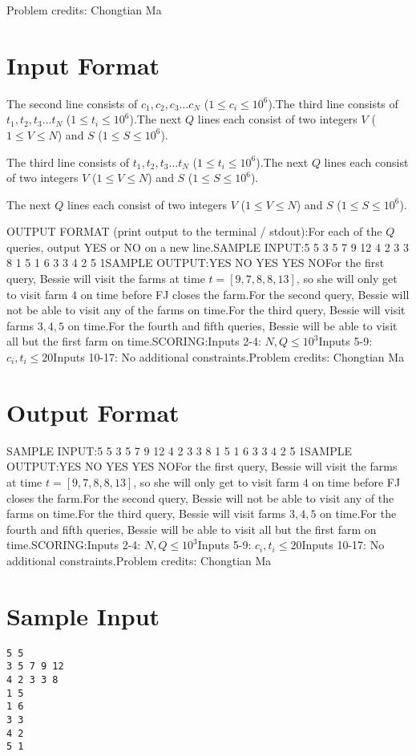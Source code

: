 \documentclass[12pt]{article}
\begin{document}
Problem credits: Chongtian Ma



\section*{Input Format}
The second line consists of $c_1, c_2, c_3 \dots c_N$ ($1 \leq c_i \leq 10^6$).The third line consists of $t_1, t_2, t_3 \dots t_N$ ($1 \leq t_i \leq 10^6$).The next $Q$ lines each consist of two integers $V$ ($1 \leq V \leq N$) and $S$
($1 \leq S \leq 10^6$).

The third line consists of $t_1, t_2, t_3 \dots t_N$ ($1 \leq t_i \leq 10^6$).The next $Q$ lines each consist of two integers $V$ ($1 \leq V \leq N$) and $S$
($1 \leq S \leq 10^6$).

The next $Q$ lines each consist of two integers $V$ ($1 \leq V \leq N$) and $S$
($1 \leq S \leq 10^6$).

OUTPUT FORMAT (print output to the terminal / stdout):For each of the $Q$ queries, output YES or NO on a new line.SAMPLE INPUT:5 5
3 5 7 9 12
4 2 3 3 8
1 5
1 6
3 3
4 2
5 1SAMPLE OUTPUT:YES
NO
YES
YES
NOFor the first query, Bessie will visit the farms at time $t = [9, 7, 8, 8, 13]$,
so she will only get to visit farm $4$ on time before FJ closes the farm.For the second query, Bessie will not be able to visit any of the farms on time.For the third query, Bessie will visit farms $3, 4, 5$ on time.For the fourth and fifth queries, Bessie will be able to visit all but the first
farm on time.SCORING:Inputs 2-4: $N,Q\le 10^3$Inputs 5-9: $c_i, t_i \le 20$Inputs 10-17: No additional constraints.Problem credits: Chongtian Ma

\section*{Output Format}
SAMPLE INPUT:5 5
3 5 7 9 12
4 2 3 3 8
1 5
1 6
3 3
4 2
5 1SAMPLE OUTPUT:YES
NO
YES
YES
NOFor the first query, Bessie will visit the farms at time $t = [9, 7, 8, 8, 13]$,
so she will only get to visit farm $4$ on time before FJ closes the farm.For the second query, Bessie will not be able to visit any of the farms on time.For the third query, Bessie will visit farms $3, 4, 5$ on time.For the fourth and fifth queries, Bessie will be able to visit all but the first
farm on time.SCORING:Inputs 2-4: $N,Q\le 10^3$Inputs 5-9: $c_i, t_i \le 20$Inputs 10-17: No additional constraints.Problem credits: Chongtian Ma

\section*{Sample Input}
\begin{verbatim}
5 5
3 5 7 9 12
4 2 3 3 8
1 5
1 6
3 3
4 2
5 1
\end{verbatim}
\end{document}
